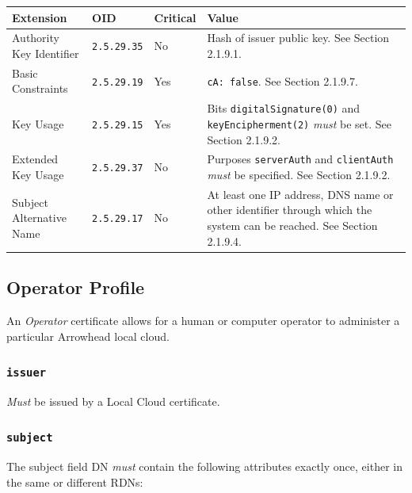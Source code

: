 \vspace*{0.5cm}
\noindent\begin{tabularx}{\textwidth}{| p{4cm} | p{2cm} | p{1.2cm} | X |} \hline
\rowcolor{gray!33} Extension & OID                & Critical & Value \\ \hline

Authority Key Identifier     & \texttt{2.5.29.35} & No       & Hash of issuer public key. See Section 2.1.9.1. \\ \hline
Basic Constraints            & \texttt{2.5.29.19} & Yes      & \texttt{cA: false}. See Section 2.1.9.7. \\ \hline
Key Usage                    & \texttt{2.5.29.15} & Yes      & Bits \texttt{digitalSignature(0)} and \texttt{keyEncipherment(2)} \textit{must} be set. See Section 2.1.9.2. \\ \hline
Extended Key Usage           & \texttt{2.5.29.37} & No       & Purposes \texttt{serverAuth} and \texttt{clientAuth} \textit{must} be specified. See Section 2.1.9.2. \\ \hline
Subject Alternative Name     & \texttt{2.5.29.17} & No       & At least one IP address, DNS name or other identifier through which the system can be reached. See Section 2.1.9.4. \\ \hline

\end{tabularx}
\vspace*{0.5cm}

\newpage
\subsection{Operator Profile}

An \textit{Operator} certificate allows for a human or computer operator to administer a particular Arrowhead local cloud.

\subsubsection{\texttt{issuer}}

\textit{Must} be issued by a Local Cloud certificate.

\subsubsection{\texttt{subject}}

The subject field DN \textit{must} contain the following attributes exactly once, either in the same or different RDNs:

